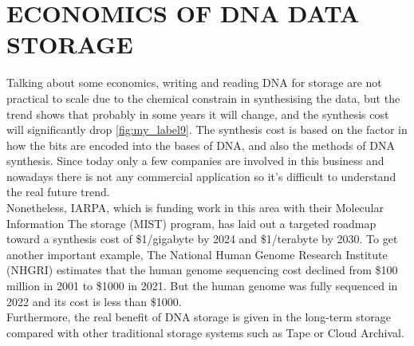 \documentclass[10pt,twocolumn,twoside]{gsajnl}
\begin{document}
\section{ECONOMICS OF DNA DATA STORAGE}
Talking about some economics, writing and reading DNA for storage are not practical to scale due to the chemical constrain in synthesising the data, but the trend shows that probably in some years it will change, and the synthesis cost will significantly drop \ref{fig:my_label9}. 
The synthesis cost is based on the factor in how the bits are encoded into the bases of DNA, and also the methods of DNA synthesis. Since today only a few companies are involved in this business and nowadays there is not any commercial application so it's difficult to understand the real future trend.\\
Nonetheless, IARPA, which is funding work in this area with their Molecular Information 
The storage (MIST) program, has laid out a targeted roadmap toward a synthesis cost of \$1/gigabyte by 2024 and \$1/terabyte by 2030.
To get another important example, The National Human Genome Research Institute (NHGRI) estimates that the human genome sequencing cost declined from \$100 million in 2001 to \$1000 in 2021. But the human genome was fully sequenced in 2022 and its cost is less than \$1000.\\
Furthermore, the real benefit of DNA storage is given in the long-term storage compared with other traditional storage systems such as Tape or Cloud Archival.
\end{document}
